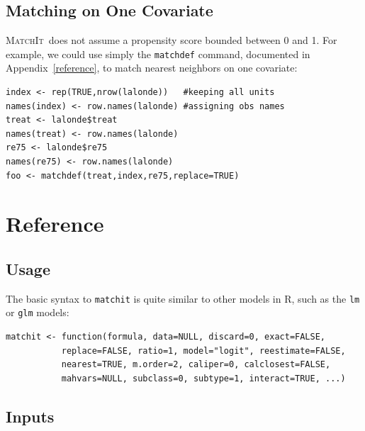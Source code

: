 \documentclass[oneside,letterpaper,titlepage]{article}
\newcommand{\MatchIt}{\textsc{MatchIt}}
\begin{document}
\subsection{Matching on One Covariate}
\MatchIt\ does not assume a propensity score bounded between 0 and 1.
For example, we could use simply the \texttt{matchdef} command,
documented in Appendix~\ref{reference}, to match nearest neighbors on
one covariate:

\begin{verbatim}
index <- rep(TRUE,nrow(lalonde))   #keeping all units
names(index) <- row.names(lalonde) #assigning obs names
treat <- lalonde$treat
names(treat) <- row.names(lalonde)
re75 <- lalonde$re75
names(re75) <- row.names(lalonde)
foo <- matchdef(treat,index,re75,replace=TRUE)
\end{verbatim}

\section{Reference}

\subsection{Usage}

The basic syntax to \texttt{matchit} is quite similar to other models in R, such as the
\texttt{lm} or \texttt{glm} models: 

\begin{verbatim}
matchit <- function(formula, data=NULL, discard=0, exact=FALSE,
           replace=FALSE, ratio=1, model="logit", reestimate=FALSE,
           nearest=TRUE, m.order=2, caliper=0, calclosest=FALSE,
           mahvars=NULL, subclass=0, subtype=1, interact=TRUE, ...)
\end{verbatim}

\subsection{Inputs}
\end{document}
